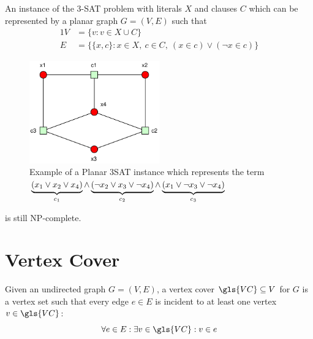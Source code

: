 
\begin{problem}
  \label{prob:planar_3SAT}
  An instance of the 3-SAT problem with literals \(X\) and
  clauses \(C\) which can be represented by a planar graph
  \(G = (V,E)\) such that
  \begin{alignat*}{1}
    V &= \{v : v \in X \cup C\} \\
    E &= \{ \{x, c\} :
      x \in X,~
      c \in C,~
      (x \in c) \lor (\lnot x \in c)
    \}
  \end{alignat*}
\end{problem}


\begin{figure}[ht]
  \centering
  \includegraphics[width=0.5\textwidth]{img/example_planar_3SAT.pdf}
  \caption{\label{fig:example_planar_3SAT}Example of a Planar 3SAT %
    instance which represents the term \(%
      \protect\underbrace{(x_1 \lor x_2 \lor x_4)}_{c_1}\land%
      \protect\underbrace{(\lnot x_2 \lor x_3 \lor \lnot x_4)}_{c_2}\land%
      \protect\underbrace{(x_1 \lor \lnot x_3 \lor \lnot x_4)}_{c_3}%
    \)}
\end{figure}


\begin{theorem}
   is still NP-complete.~\cite{planar_3SAT}
\end{theorem}

\section{Vertex Cover}

\begin{definition}
  \label{def:vertex_cover}
  Given an undirected graph \(G=(V,E)\), a vertex cover
  \(\gls{VC} \subseteq V\) for \(G\) is a vertex set such that
  every edge \(e \in E\) is incident to at least one vertex
  \(v \in \gls{VC}\):
  \[ \forall e \in E: \exists v \in \gls{VC}: v \in e \]
\end{definition}


